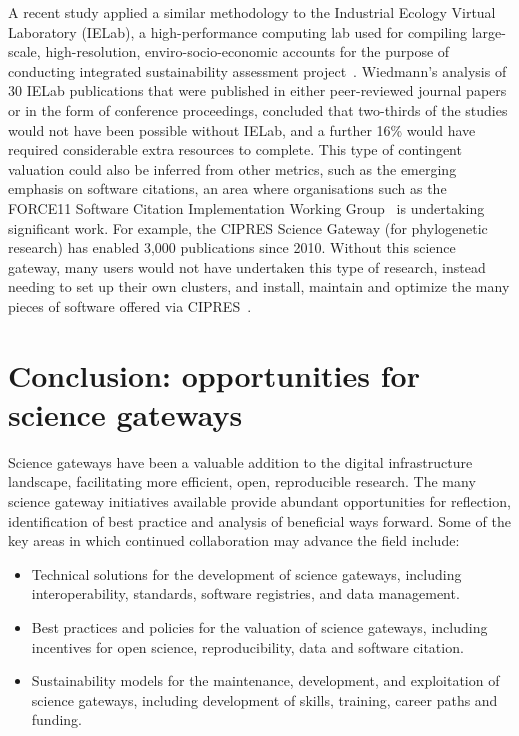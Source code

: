 \documentclass[review]{elsarticle}
\begin{document}
A recent study applied a similar methodology to the Industrial Ecology Virtual Laboratory (IELab), a high-performance computing lab used for compiling large-scale, high-resolution, enviro-socio-economic accounts for the purpose of conducting integrated sustainability assessment project~\cite{Wiedmann2017-38}. 
Wiedmann's analysis of 30 IELab publications that were published in either peer-reviewed journal papers or in the form of conference proceedings, concluded that two-thirds of the studies would not have been possible without IELab, and a further 16\% would have required considerable extra resources to complete. 
This type of contingent valuation could also be inferred from other metrics, such as the emerging emphasis on software citations, an area where organisations such as the FORCE11 Software Citation Implementation Working Group~\cite{force11-39} is undertaking significant work. For example, the CIPRES Science Gateway (for phylogenetic research) has enabled 3,000 publications since 2010. Without this science gateway, many users would not have undertaken this type of research, instead needing to set up their own clusters, and install, maintain and optimize the many pieces of software offered via CIPRES~\cite{Miller2012-40}. 

\section{Conclusion: opportunities for science gateways}

Science gateways have been a valuable addition to the digital infrastructure landscape, facilitating more efficient, open, reproducible research. The many science gateway initiatives available provide abundant opportunities for reflection, identification of best practice and analysis of beneficial ways forward. Some of the key areas in which continued collaboration may advance the field include:
\begin{itemize}
	\item Technical solutions for the development of science gateways, including interoperability, standards, software registries, and data management.
	\item Best practices and policies for the valuation of science gateways, including incentives for open science, reproducibility, data and software citation.
	\item Sustainability models for the maintenance, development, and exploitation of science gateways, including development of skills, training, career paths and funding.
\end{itemize}
\end{document}
